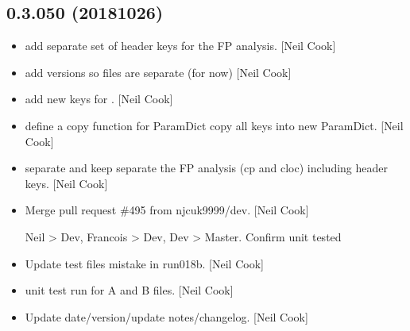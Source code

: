 \documentclass[a4paper,10pt,english]{report}
\begin{document}
\subsection{0.3.050 (2018\sphinxhyphen{}10\sphinxhyphen{}26)}
\label{\detokenize{misc/changelog:id300}}\begin{itemize}
\item {} 
 \sphinxhyphen{} add separate set of header keys for the FP
analysis. {[}Neil Cook{]}

\item {} 
 \sphinxhyphen{} add  versions so files are separate (for now)
{[}Neil Cook{]}

\item {} 
 \sphinxhyphen{} add new keys for . {[}Neil Cook{]}

\item {} 
 \sphinxhyphen{} define a copy function for ParamDict \sphinxhyphen{} copy all keys
into new ParamDict. {[}Neil Cook{]}

\item {} 
 \sphinxhyphen{} separate and keep separate the FP analysis
(cp and cloc) \sphinxhyphen{} including header keys. {[}Neil Cook{]}

\item {} 
Merge pull request \#495 from njcuk9999/dev. {[}Neil Cook{]}

Neil \textendash{}\textgreater{} Dev, Francois \textendash{}\textgreater{} Dev, Dev \textendash{}\textgreater{} Master. Confirm unit tested

\item {} 
Update test files \sphinxhyphen{} mistake in run018b. {[}Neil Cook{]}

\item {} 
 \sphinxhyphen{} unit test run for A and B files. {[}Neil Cook{]}

\item {} 
Update date/version/update notes/changelog. {[}Neil Cook{]}

\end{itemize}
\end{document}
